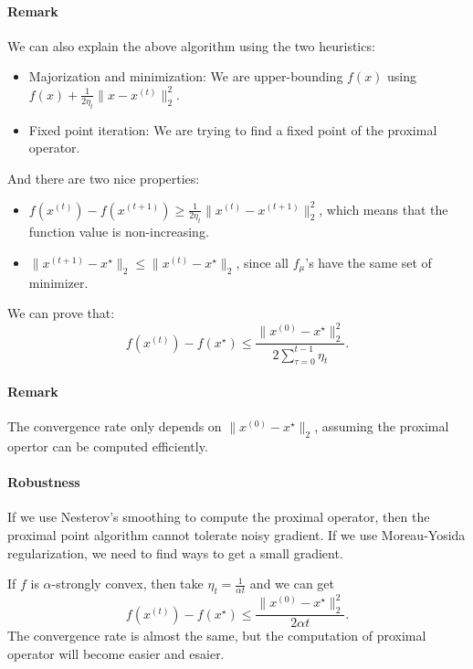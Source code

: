 \documentclass[openany]{book}
\theoremstyle{definition}
\theoremstyle{remark}
\begin{document}
\paragraph{Remark}
We can also explain the above algorithm using the two heuristics:
\begin{itemize}
    \item Majorization and minimization: We are upper-bounding $f(x)$ using $f(x)+\frac{1}{2\eta_t}\|x-x^{(t)}\|_2^2$.
    \item Fixed point iteration: We are trying to find a fixed point of the proximal operator.
\end{itemize}
And there are two nice properties:
\begin{itemize}
    \item $f(x^{(t)})-f(x^{(t+1)})\ge \frac{1}{2\eta_t}\|x^{(t)}-x^{(t+1)}\|_2^2$, which means that the function value is non-increasing.
    \item $\|x^{(t+1)}-x^{\star}\|_2\le\|x^{(t)}-x^{\star}\|_2$, since all $f_{\mu}$'s have the same set of minimizer.
\end{itemize}

We can prove that:
\begin{equation}
    f(x^{(t)})-f(x^{\star})\le \frac{\|x^{(0)}-x^{\star}\|_2^2}{2 \sum_{\tau=0}^{t-1}\eta_t}.
\end{equation}

\paragraph{Remark}
The convergence rate only depends on $\|x^{(0)}-x^{\star}\|_2$, assuming the proximal opertor can be computed efficiently.

\paragraph{Robustness}
If we use Nesterov's smoothing to compute the proximal operator, then the proximal point algorithm cannot tolerate noisy gradient. If we use Moreau-Yosida regularization, we need to find ways to get a small gradient.

If $f$ is $\alpha$-strongly convex, then take $\eta_t=\frac{1}{\alpha t}$ and we can get
\begin{equation}
    f(x^{(t)})-f(x^{\star})\le \frac{\|x^{(0)}-x^{\star}\|_2^2}{2\alpha t}.
\end{equation}
The convergence rate is almost the same, but the computation of proximal operator will become easier and esaier.
\end{document}

